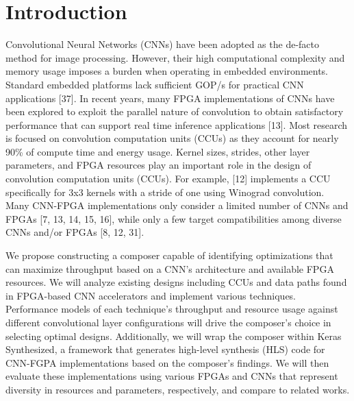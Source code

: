 \chapter {Introduction}
 
Convolutional Neural Networks (CNNs) have been adopted as the de-facto method for image processing. However, their high computational complexity and memory usage imposes a burden when operating in embedded environments. Standard embedded platforms lack sufficient GOP/s for practical CNN applications [37]. In recent years, many FPGA implementations of CNNs have been explored to exploit the parallel nature of convolution to obtain satisfactory performance that can support real time inference applications [13]. Most research is focused on convolution computation units (CCUs) as they account for nearly 90\% of compute time and energy usage. Kernel sizes, strides, other layer parameters, and FPGA resources play an important role in the design of convolution computation units (CCUs). For example, [12] implements a CCU specifically for 3x3 kernels with a stride of one using Winograd convolution. Many CNN-FPGA implementations only consider a limited number of CNNs and FPGAs [7, 13, 14, 15, 16], while only a few target compatibilities among diverse CNNs and/or FPGAs [8, 12, 31].

We propose constructing a composer capable of identifying optimizations that can maximize throughput based on a CNN’s architecture and available FPGA resources. We will analyze existing designs including CCUs and data paths found in FPGA-based CNN accelerators and implement various techniques. Performance models of each technique’s throughput and resource usage against different convolutional layer configurations will drive the composer’s choice in selecting optimal designs. Additionally, we will wrap the composer within Keras Synthesized, a framework that generates high-level synthesis (HLS) code for CNN-FGPA implementations based on the composer’s findings. We will then evaluate these implementations using various FPGAs and CNNs that represent diversity in resources and parameters, respectively, and compare to related works.